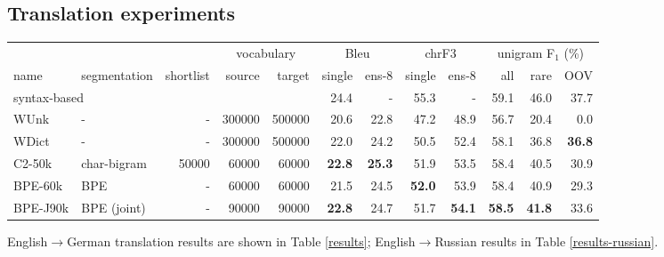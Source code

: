 \documentclass[11pt]{article}
\begin{document}
\subsection{Translation experiments}

\begin{table*}
\centering
\small
\setlength{\tabcolsep}{3pt}
\begin{tabular}{llrrr|rr|rr|rrr}
&&&\multicolumn{2}{c|}{vocabulary}&\multicolumn{2}{c|}{{\sc Bleu}} & \multicolumn{2}{c|}{{\sc chrF3}} & \multicolumn{3}{c}{unigram F$_1$ (\%)}\\
name & segmentation & shortlist & source & target & single & ens-8 & single & ens-8 & all & rare & OOV\\
\hline
\multicolumn{4}{l}{syntax-based \cite{sennrichhaddow15}} & & 
24.4 & - & 
55.3 & - & 59.1 & 46.0 & 37.7\\ %
\hline
WUnk & - & - & \num{300000} & \num{500000} & 
20.6 & 22.8 & 
47.2 & 48.9 & 56.7 & 20.4 & 0.0\\ %
WDict & - & - & \num{300000} & \num{500000} & 
22.0 & 24.2 & 
50.5 & 52.4 & 58.1 & 36.8 & \textbf{36.8}\\ %
C2-50k &char-bigram & \num{50000} & \num{60000} & \num{60000} & 
\textbf{22.8} & \textbf{25.3} & 
51.9 & 53.5 & 58.4 & 40.5 & 30.9 \\ %
BPE-60k &BPE & - & \num{60000} & \num{60000} & 
21.5 & 24.5 & 
\textbf{52.0} & 53.9 & 58.4 & 40.9 & 29.3\\ %
BPE-J90k &BPE (joint) & - & \num{90000} & \num{90000} & 
\textbf{22.8} & 24.7 & 
51.7 & \textbf{54.1} & \textbf{58.5} & \textbf{41.8} & 33.6\\ %
\end{tabular}
\caption{English$\to$German translation performance ({\sc Bleu}, {\sc chrF3} and unigram F$_1$) on newstest2015.
Ens-8: ensemble of 8 models.
Best NMT system in bold.
Unigram F$_1$ (with ensembles) is computed for all words ($n=44085$), rare words (not among top \num{50000} in training set; $n=2900$), and OOVs (not in training set; $n=1168$).}
\label{results}
\end{table*}

English$\to$German translation results are shown in Table \ref{results};
English$\to$Russian results in Table \ref{results-russian}.
\end{document}
